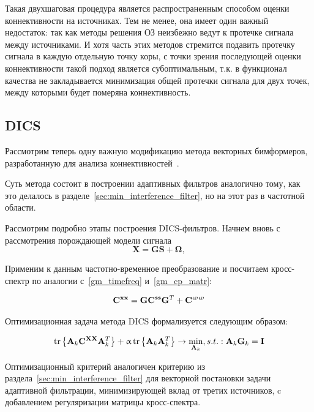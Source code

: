 Такая двухшаговая процедура является распространенным способом оценки
коннективности на источниках. Тем не менее, она имеет один важный недостаток:
так как методы решения ОЗ неизбежно ведут к протечке сигнала между источниками.
И хотя часть этих методов стремится подавить протечку сигнала в каждую отдельную
точку коры, с точки зрения последующей оценки коннективности такой подход является
субоптимальным, т.к. в функционал качества не закладывается минимизация общей
протечки сигнала для двух точек, между которыми будет померяна коннективность.

\subsection{DICS}\label{subsec:DICS}
Рассмотрим теперь одну важную модификацию метода векторных бимформеров,
разработанную для анализа коннективностей~\cite{Gross2001}.

Суть метода состоит в построении адаптивных фильтров аналогично тому, как это делалось 
в разделе~\ref{sec:min_interference_filter}, но на этот раз в частотной области.

Рассмотрим подробно этапы построения DICS-фильтров.
Начнем вновь с рассмотрения порождающей модели сигнала
\begin{equation}
    \mathbf{X} = \mathbf{G} \mathbf{S} + \mathbf{\Omega},
    \label{gm_dics}
\end{equation}


Применим к данным частотно-временное преобразование и посчитаем кросс-спектр по аналогии
с~\ref{gm_timefreq} и~\ref{gm_cp_matr}:

\begin{gather}
    \mathbf{C}^{\mathbf{x x}} = \mathbf{G} \mathbf{C}^{\mathbf{s s}} \mathbf{G}^T + \mathbf{C}^{\mathbf{\upomega \upomega}}
\end{gather}

Оптимизационная задача метода DICS формализуется следующим образом:

\begin{equation}
    \operatorname{tr}\left\{\mathbf{A}_k \mathbf{C}^{\mathbf{X X}} \mathbf{A}_k^T\right\} +
     \upalpha \operatorname{tr}\left\{\mathbf{A}_k \mathbf{A}_k^T\right\}
    \rightarrow \underset{\mathbf{A}_k}{\min}
    , s.t.: \mathbf{A}_k \mathbf{G}_k = \mathbf{I}
\end{equation}

Оптимизационный критерий аналогичен критерию из раздела~\ref{sec:min_interference_filter}
для векторной постановки задачи адаптивной фильтрации,
минимизирующей вклад от третих источников, c добавлением регуляризации матрицы кросс-спектра.

